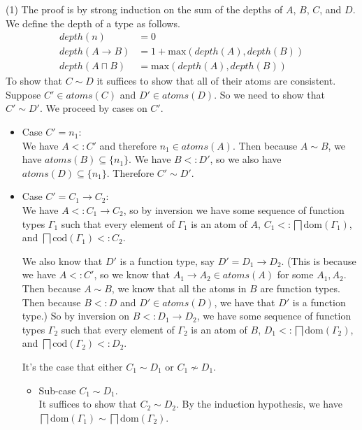 \documentclass{article}
\newcommand{\ATOMS}[1]{\mathit{atoms}(#1)}
\begin{document}
(1) The proof is by strong induction on the sum of the depths of $A$,
$B$, $C$, and $D$. We define the depth of a type as follows.
\begin{align*}
  \mathit{depth}(n) &= 0 \\
  \mathit{depth}(A \to B) &= 1 + \mathrm{max}(\mathit{depth}(A),\mathit{depth}(B)) \\
  \mathit{depth}(A \sqcap B) &= \mathrm{max}(\mathit{depth}(A),\mathit{depth}(B)) 
\end{align*}
To show that $C \sim D$ it suffices to show that
all of their atoms are consistent. Suppose $C' \in \ATOMS{C}$
and $D'\in\ATOMS{D}$. So we need to show that $C' \sim D'$.
We proceed by cases on $C'$.
\begin{itemize}
\item Case $C'=n_1$:\\
  We have $A <: C'$ and therefore $n_1 \in \ATOMS{A}$.
  Then because $A \sim B$, we have $\ATOMS{B} \subseteq \{n_1\}$.
  We have $B <: D'$, so we also have $\ATOMS{D} \subseteq \{n_1\}$.
  Therefore $C' \sim D'$.
  
\item Case $C'=C_1\to C_2$:\\
  We have $A <: C_1 \to C_2$, so by inversion we have
  some sequence of function types $\Gamma_1$ such that
  every element of $\Gamma_1$ is an atom of $A$,
  $C_1 <: \bigsqcap \mathrm{dom}(\Gamma_1)$,
  and $\bigsqcap \mathrm{cod}(\Gamma_1) <: C_2$.

  We also know that $D'$ is a function type, say $D'=D_1 \to D_2$.
  (This is because we have $A <: C'$, so we know that $A_1\to A_2 \in
  \ATOMS{A}$ for some $A_1,A_2$. Then because $A \sim B$, we know that
  all the atoms in $B$ are function types.  Then because $B <: D$ and
  $D' \in \ATOMS{D}$, we have that $D'$ is a function type.)
  So by inversion on $B <: D_1 \to D_2$, we have
  some sequence of function types $\Gamma_2$ such that
  every element of $\Gamma_2$ is an atom of $B$,
  $D_1 <: \bigsqcap \mathrm{dom}(\Gamma_2)$,
  and $\bigsqcap \mathrm{cod}(\Gamma_2) <: D_2$.

  It's the case that either $C_1 \sim D_1$ or $C_1 \not\sim D_1$.
  \begin{itemize}
  \item Sub-case $C_1 \sim D_1$.\\
    It suffices to show that $C_2 \sim D_2$.
    By the induction hypothesis, we have
    $\bigsqcap \mathrm{dom}(\Gamma_1) \sim \bigsqcap \mathrm{dom}(\Gamma_2)$.


\end{itemize}
\end{itemize}
\end{document}
